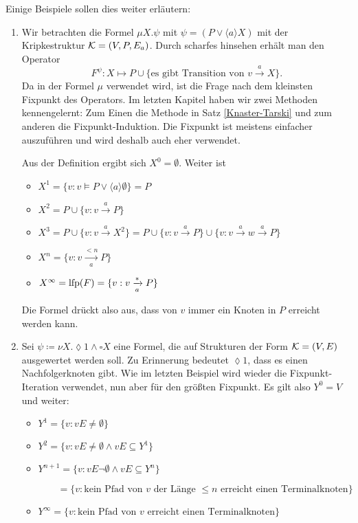 \begin{example}
Einige Beispiele sollen dies weiter erläutern:
\begin{enumerate}
	\item Wir betrachten die Formel $\mu X . \psi$ mit $\psi= (P \lor \langle a \rangle X)$ mit der Kripkestruktur $\mathcal{K}=(V,P,E_a)$. Durch scharfes hinsehen erhält man den Operator $$F^\psi :X \mapsto P \cup \{\text{es gibt Transition von } v \xrightarrow{a} X\}.$$ Da in der Formel $\mu$ verwendet wird, ist die Frage nach dem kleinsten Fixpunkt des Operators. 
	Im letzten Kapitel haben wir zwei Methoden kennengelernt: Zum Einen die Methode in Satz \ref{Knaster-Tarski} und zum anderen die Fixpunkt-Induktion. Die Fixpunkt ist meistens einfacher auszuführen und wird deshalb auch eher verwendet.
	
	Aus der Definition ergibt sich $X^0=\emptyset$. Weiter ist
	\begin{itemize}
		\item $X^1=\{v : v \models P \lor \langle a \rangle \emptyset\}=P$
		\item $X^2=P \cup \{v : v \xrightarrow{a} P\}$
		\item $X^3=P \cup \{v : v\xrightarrow{a} X^2\}=P\cup \{v : v\xrightarrow{a}P\} \cup \{v : v\xrightarrow{a}w\xrightarrow{a}P\}$
		\item $X^n=\{v: v \xrightarrow[a]{<n} P\}$
		\item $X^\infty = \operatorname{lfp}(F) = \{v : v \xrightarrow[a]{\ast} P\}$
	\end{itemize}
	
	Die Formel drückt also aus, dass von $v$ immer ein Knoten in $P$ erreicht werden kann.
	
	\item Sei $\psi\coloneqq \nu X. \lozenge 1 \land \square X$ eine Formel, die auf Strukturen der Form $\mathcal{K}=(V,E)$ ausgewertet werden soll. Zu Erinnerung bedeutet $\lozenge 1$, dass es einen Nachfolgerknoten gibt. Wie im letzten Beispiel wird wieder die Fixpunkt-Iteration verwendet, nun aber für den größten Fixpunkt. Es gilt also $Y^0=V$ und weiter:
	\begin{itemize}
		\item $Y^1 = \{v : vE\neq\emptyset\}$
		\item $Y^2 = \{v : vE\neq\emptyset \land vE \subseteq Y^1\}$
		\item $Y^{n+1} = \{v : vE\neg\emptyset \land vE\subseteq Y^n\}$ 
		
		$\qquad= \{v : \text{kein Pfad von } v \text{ der Länge } \leq n \text{ erreicht einen Terminalknoten}\}$
		\item $Y^\infty = \{v : \text{kein Pfad von } v \text{ erreicht einen Terminalknoten}\}$
	\end{itemize}
	

\end{enumerate}
\end{example}
